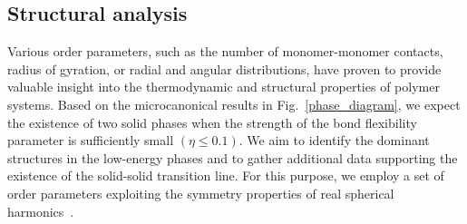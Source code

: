 \documentclass[12pt]{report}
\begin{document}
\subsection{Structural analysis}
Various order parameters, such as the number of monomer-monomer
contacts, radius of gyration, or radial and angular distributions, have
proven to provide valuable insight into the thermodynamic and structural
properties of polymer systems. Based on the microcanonical results in
Fig.~\ref{phase_diagram}, we expect the existence of two solid phases
when the strength of the bond flexibility parameter is sufficiently small
$(\eta \leq 0.1)$. We aim to identify the dominant structures in the
low-energy phases and to gather additional data supporting the existence of
the
solid-solid transition line. For this purpose, we employ a set of order
parameters exploiting the symmetry properties of real spherical
harmonics~\cite{Neirotti2000}.
\end{document}
